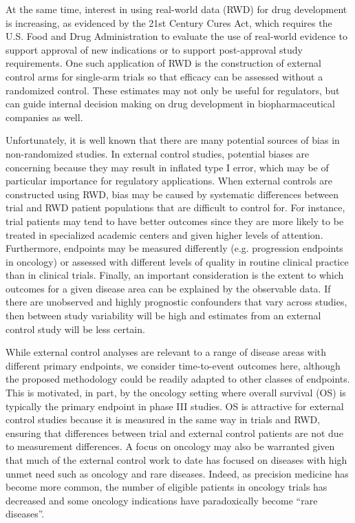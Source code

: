 \documentclass[11pt,final,fleqn]{article}\usepackage[]{graphicx}\usepackage[]{color}
\begin{document}
At the same time, interest in using  real-world data (RWD) for drug development is increasing, as evidenced by the 21st Century Cures Act, which requires the U.S. Food and Drug Administration to evaluate the use of real-world evidence to support approval of new indications or to support post-approval study requirements. One such application of RWD is the construction of external control arms for single-arm trials so that efficacy can be assessed without a randomized control.\cite{burcu2020real, schmidli2020beyond, burger2021use} These estimates may not only be useful for regulators, but can guide internal decision making on drug development in biopharmaceutical companies as well.\cite{beyer2020multistate}

Unfortunately, it is well known that there are many potential sources of bias in non-randomized studies.\cite{hernan2020} In external control studies, potential biases are concerning because they may result in inflated type I error, which may be of particular importance for regulatory applications. When external controls are constructed using RWD, bias may be caused by systematic differences between trial and RWD patient populations that are difficult to control for. For instance, trial patients may tend to have better outcomes since they are more likely to be treated in specialized academic centers and given higher levels of attention. Furthermore, endpoints may be measured differently (e.g. progression endpoints in oncology) or assessed with different levels of quality in routine clinical practice than in clinical trials.  Finally, an important consideration is the extent to which outcomes for a given disease area can be explained by the observable data. If there are unobserved and highly prognostic confounders that vary across studies, then between study variability will be high and estimates from an external control study will be less certain.\cite{burger2021use} 

While external control analyses are relevant to a range of disease areas with different primary endpoints, we consider time-to-event outcomes here, although the proposed methodology could be readily adapted to other classes of endpoints. This is motivated, in part, by the oncology setting where overall survival (OS) is typically the primary endpoint in phase III studies. OS is attractive for external control studies because it is measured in the same way in trials and RWD, ensuring that differences between trial and external control patients are not due to measurement differences. A focus on oncology may also be warranted given that much of the external control work to date has focused on diseases with high unmet need such as oncology and rare diseases.\cite{feinberg2020use, wu2020use} Indeed, as precision medicine has become more common, the number of eligible patients in oncology trials has decreased and some oncology indications have paradoxically become ``rare diseases''.\cite{thorlund2020synthetic}
\end{document}
